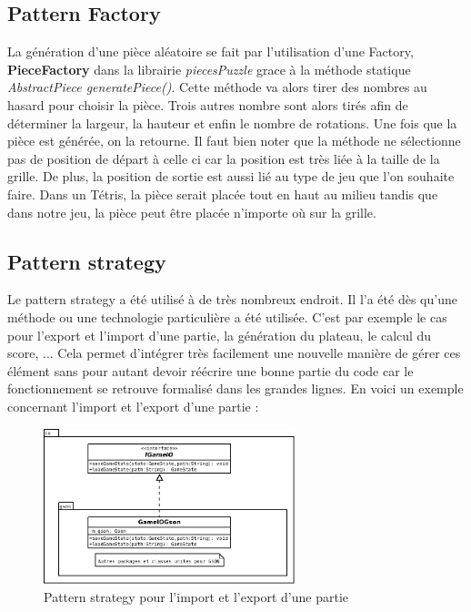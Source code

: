 \documentclass[report]{BetterDocument}
\begin{document}
		\subsection{Pattern Factory}

			La génération d'une pièce aléatoire se fait par l'utilisation d'une Factory, \textbf{PieceFactory} dans la librairie \textit{piecesPuzzle} grace à la méthode statique \textit{AbstractPiece generatePiece()}. Cette méthode va alors tirer des nombres au hasard pour choisir la pièce. Trois autres nombre sont alors tirés afin de déterminer la largeur, la hauteur et enfin le nombre de rotations. Une fois que la pièce est générée, on la retourne. Il faut bien noter que la méthode ne sélectionne pas de position de départ à celle ci car la position est très liée à la taille de la grille. De plus, la position de sortie est aussi lié au type de jeu que l'on souhaite faire. Dans un Tétris, la pièce serait placée tout en haut au milieu tandis que dans notre jeu, la pièce peut être placée n'importe où sur la grille.

		\subsection{Pattern strategy}

			Le pattern strategy a été utilisé à de très nombreux endroit. Il l'a été dès qu'une méthode ou une technologie particulière a été utilisée. C'est par exemple le cas pour l'export et l'import d'une partie, la génération du plateau, le calcul du score, ... Cela permet d'intégrer très facilement une nouvelle manière de gérer ces élément sans pour autant devoir réécrire une bonne partie du code car le fonctionnement se retrouve formalisé dans les grandes lignes. En voici un exemple concernant l'import et l'export d'une partie :

			\begin{figure}[H]
				\centering\includegraphics[width=0.65\textwidth, keepaspectratio]{img/pattern_strategy.png}
				\caption{Pattern strategy pour l'import et l'export d'une partie}
			\end{figure}
\end{document}
